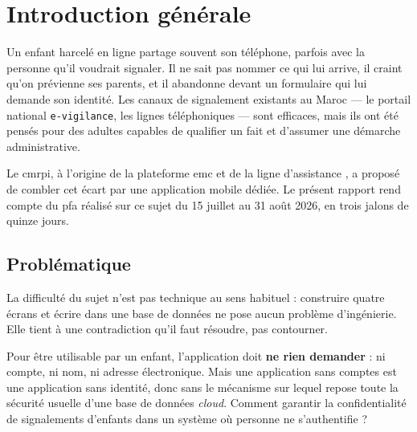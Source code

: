 \documentclass[11pt,a4paper,oneside,openany]{report}
\begin{document}
\cleardoublepage
{}
\tableofcontents
\begingroup
\let\originalclearpage\clearpage
\let\clearpage\relax
\vspace*{26pt}
\listoffigures
\vspace*{20pt}
\listoftables
\vspace*{20pt}
\printnoidxglossary[type=\acronymtype,title={Liste des acronymes},
                    toctitle={Liste des acronymes}]
\let\clearpage\originalclearpage
\endgroup
{}

\cleardoublepage
{}
\setcounter{page}{1}

\chapter{Introduction générale}
\label{chap:intro}

Un enfant harcelé en ligne partage souvent son téléphone, parfois avec la
personne qu'il voudrait signaler. Il ne sait pas nommer ce qui lui arrive, il
craint qu'on prévienne ses parents, et il abandonne devant un formulaire qui lui
demande son identité. Les canaux de signalement existants au Maroc — le portail
national \texttt{e-vigilance}, les lignes téléphoniques — sont efficaces, mais
ils ont été pensés pour des adultes capables de qualifier un fait et d'assumer
une démarche administrative.

Le \gls{cmrpi}, à l'origine de la plateforme \gls{emc} et de la ligne
d'assistance \emc, a proposé de combler cet écart par une application mobile
dédiée. Le présent rapport rend compte du \gls{pfa} réalisé sur ce sujet du
15 juillet au 31 août 2026, en trois jalons de quinze jours.

\section{Problématique}

La difficulté du sujet n'est pas technique au sens habituel : construire quatre
écrans et écrire dans une base de données ne pose aucun problème d'ingénierie.
Elle tient à une contradiction qu'il faut résoudre, pas contourner.

\begin{constat}
Pour être utilisable par un enfant, l'application doit \textbf{ne rien demander} :
ni compte, ni nom, ni adresse électronique. Mais une application sans comptes est
une application sans identité, donc sans le mécanisme sur lequel repose toute la
sécurité usuelle d'une base de données \emph{cloud}. Comment garantir la
confidentialité de signalements d'enfants dans un système où personne ne
s'authentifie ?
\end{constat}
\end{document}

